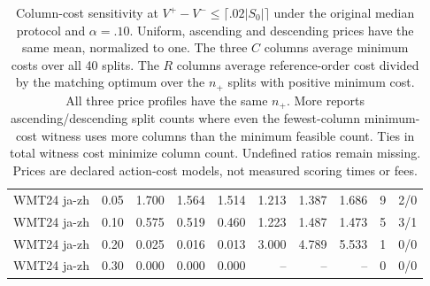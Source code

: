 \begin{table}[t]
\begin{tabular}{lrrrrrrrrr}
WMT24 ja-zh & 0.05 & 1.700 & 1.564 & 1.514 & 1.213 & 1.387 & 1.686 & 9 & 2/0 \\
WMT24 ja-zh & 0.10 & 0.575 & 0.519 & 0.460 & 1.223 & 1.487 & 1.473 & 5 & 3/1 \\
WMT24 ja-zh & 0.20 & 0.025 & 0.016 & 0.013 & 3.000 & 4.789 & 5.533 & 1 & 0/0 \\
WMT24 ja-zh & 0.30 & 0.000 & 0.000 & 0.000 & -- & -- & -- & 0 & 0/0 \\
\bottomrule
\end{tabular}
\caption{Column-cost sensitivity at $V^+-V^-\le\lceil.02|S_0|\rceil$ under the original median protocol and $\alpha=.10$. Uniform, ascending and descending prices have the same mean, normalized to one. The three $C$ columns average minimum costs over all 40 splits. The $R$ columns average reference-order cost divided by the matching optimum over the $n_+$ splits with positive minimum cost. All three price profiles have the same $n_+$. More reports ascending/descending split counts where even the fewest-column minimum-cost witness uses more columns than the minimum feasible count. Ties in total witness cost minimize column count. Undefined ratios remain missing. Prices are declared action-cost models, not measured scoring times or fees.}
\label{tab:column-cost-tolerant}
\end{table}
